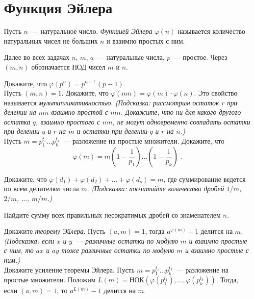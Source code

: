 

\section*{Функция Эйлера}


Пусть $n$~--- натуральное число.
\emph{Функцией Эйлера $\varphi(n)$}
называется количество натуральных чисел не больших $n$ и взаимно простых с ним.
\par
Далее во всех задачах $n$, $m$, $a$~--- натуральные числа, $p$~--- простое.
Через $(m, n)$ обозначается НОД чисел $m$ и $n$.

\begin{problems}

\item
\sbp Докажите, что $\varphi(p^n) = p^{n-1} (p-1)$.
\\
\sbp Пусть $(m, n) = 1$.
Докажите, что $\varphi(m n) = \varphi(m) \cdot \varphi(n)$.
Это свойство называется \emph{мультипликативностью}.
\emph{(Подсказка:
рассмотрим остаток $r$ при делении на $m n$ взаимно простой с $m n$.
Докажите, что ни для какого другого остатка $q$, взаимно простого с $mn$, не могут
одновременно совпадать остатки при делении $q$ и $r$ на $m$ и остатки при делении $q$ и
$r$ на $n$.)}
\\
\sbp
Пусть $m = p_1^{t_1} \ldots p_k^{t_k}$~--- разложение на простые множители.
Докажите, что
\[
    \varphi(m)
=
    m \left(1 - \frac{1}{p_1}\right) \ldots \left(1 - \frac{1}{p_k}\right)
\;.\]

\item
Докажите, что $\varphi(d_1) + \varphi(d_2) + \ldots + \varphi(d_s) = m$, где
суммирование ведется по всем делителям числа $m$.
\emph{(Подсказка: посчитайте количество дробей $1 / m$, $2 / m$, $\ldots$, $m / m$.)}

\item
Найдите сумму всех правильных несократимых дробей со знаменателем $n$.

\item
\sbp
Докажите \emph{теорему Эйлера}.
Пусть $(a, m) = 1$, тогда $a^{\varphi(m)} - 1$ делится на $m$.
\emph{(Подсказка: если $x$ и $y$~--- различные остатки по модулю $m$ и взаимно простые
с ним, то $a x$ и $a y$ тоже различные остатки по модулю $m$ и взаимно простые с ним.)}
\\
\sbp
Докажите усиление теоремы Эйлера.
Пусть $m = p_1^{t_1} \ldots p_k^{t_k}$~--- разложение на простые множители.
Положим $L(m) = \text{НОК}(\varphi(p_1^{t_1}), \ldots, \varphi(p_k^{t_k}))$.
Тогда, если $(a, m)=1$, то $a^{L(m)} - 1$ делится на $m$.


\end{problems}
